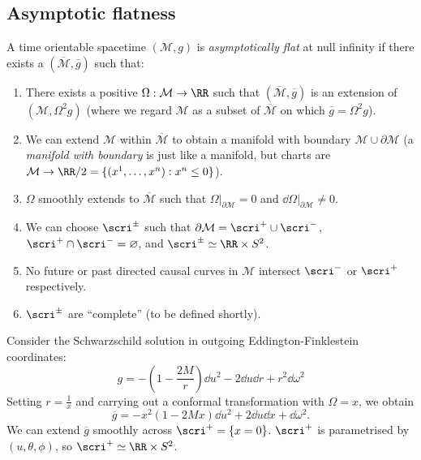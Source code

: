 \documentclass{jknotes}
\begin{document}
\subsection{Asymptotic flatness}

\begin{defn}
    A time orientable spacetime \((\mathcal{M},g)\) is \emph{asymptotically flat} at null infinity if there exists a \((\overline{\mathcal{M}},\overline{g})\) such that:
    \begin{enumerate}
        \item There exists a positive \(\Omega:\mathcal{M}\to\RR\) such that \((\overline{\mathcal{M}},\overline{g})\) is an extension of \((\mathcal{M},\Omega^2g)\) (where we regard \(\mathcal{M}\) as a subset of \(\overline{\mathcal{M}}\) on which \(\overline{g}=\Omega^2g\)).
        \item We can extend \(\mathcal{M}\) within \(\overline{\mathcal{M}}\) to obtain a manifold with boundary \(\mathcal{M}\cup\partial\mathcal{M}\) (a \emph{manifold with boundary} is just like a manifold, but charts are \(\mathcal{M}\to\RR/2=\{(x^1,\dots,x^n):x^n\le0\}\)).
        \item \(\Omega\) smoothly extends to \(\overline{\mathcal{M}}\) such that \(\left.\Omega\right|_{\partial\mathcal{M}}=0\) and \(\left.\dd{\Omega}\right|_{\partial\mathcal{M}}\ne0\).
        \item We can choose \(\scri^\pm\) such that \(\partial\mathcal{M} = \scri^+\cup\scri^-\), \(\scri^+\cap\scri^- = \varnothing\), and \(\scri^\pm \simeq \RR\times S^2\).
        \item No future or past directed causal curves in \(\mathcal{M}\) intersect \(\scri^-\) or \(\scri^+\) respectively.
        \item \(\scri^\pm\) are ``complete'' (to be defined shortly).
    \end{enumerate}
\end{defn}

\begin{eg}
    Consider the Schwarzschild solution in outgoing Eddington-Finklestein coordinates:
    \begin{equation}
        g = -\left(1-\frac{2M}{r}\right)\dd{u}^2 - 2\dd{u}\dd{r}+r^2\dd{\omega}^2
    \end{equation}
    Setting \(r=\frac{1}{x}\) and carrying out a conformal transformation with \(\Omega = x\), we obtain
    \begin{equation}
        \overline{g} = -x^2(1-2Mx)\dd{u}^2 + 2\dd{u}\dd{x} + \dd{\omega}^2.
    \end{equation}
    We can extend \(\overline{g}\) smoothly across \(\scri^+=\{x=0\}\). \(\scri^+\) is parametrised by \((u,\theta,\phi)\), so \(\scri^+ \simeq \RR\times S^2\).
\end{eg}
\end{document}

